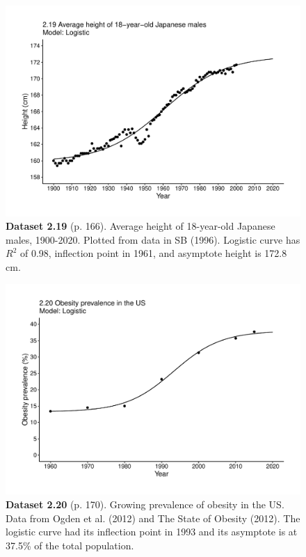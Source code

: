 \documentclass[aps,rmp,preprint,superscriptaddress,10pt,onecolumn]{article}
\begin{document}
\clearpage
\begin{figure}[h]
\includegraphics[width=\textwidth]{output/figs-ggplot/2.19.pdf}
\caption*{\textbf{Dataset 2.19} (p. 166). Average height of 18-year-old Japanese males, 1900-2020. Plotted from data in SB (1996). Logistic curve has $R^2$ of 0.98, inflection point in 1961, and asymptote height is 172.8 cm. }
\end{figure}
	
\clearpage
\begin{figure}[h]
\includegraphics[width=\textwidth]{output/figs-ggplot/2.20.pdf}
\caption*{\textbf{Dataset 2.20} (p. 170). Growing prevalence of obesity in the US. Data from Ogden et al. (2012) and The State of Obesity (2012). The logistic curve had its inflection point in 1993 and its asymptote is at 37.5\% of the total population.}
\end{figure}
	
\end{document}
